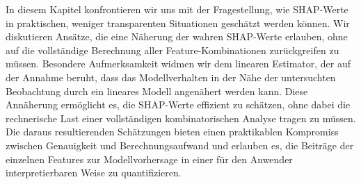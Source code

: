 In diesem Kapitel konfrontieren wir uns mit der Fragestellung, wie SHAP-Werte in praktischen, 
weniger transparenten Situationen geschätzt werden können. Wir diskutieren Ansätze, 
die eine Näherung der wahren SHAP-Werte erlauben, ohne auf die vollständige Berechnung 
aller Feature-Kombinationen zurückgreifen zu müssen. Besondere Aufmerksamkeit widmen wir dem 
linearen Estimator, der auf der Annahme beruht, dass das Modellverhalten in der Nähe der untersuchten Beobachtung 
durch ein lineares Modell angenähert werden kann. Diese Annäherung ermöglicht es, die SHAP-Werte 
effizient zu schätzen, ohne dabei die rechnerische Last einer vollständigen kombinatorischen Analyse 
tragen zu müssen. Die daraus resultierenden Schätzungen bieten einen praktikablen Kompromiss zwischen Genauigkeit 
und Berechnungsaufwand und erlauben es, die Beiträge der einzelnen Features zur Modellvorhersage in einer für 
den Anwender interpretierbaren Weise zu quantifizieren.
